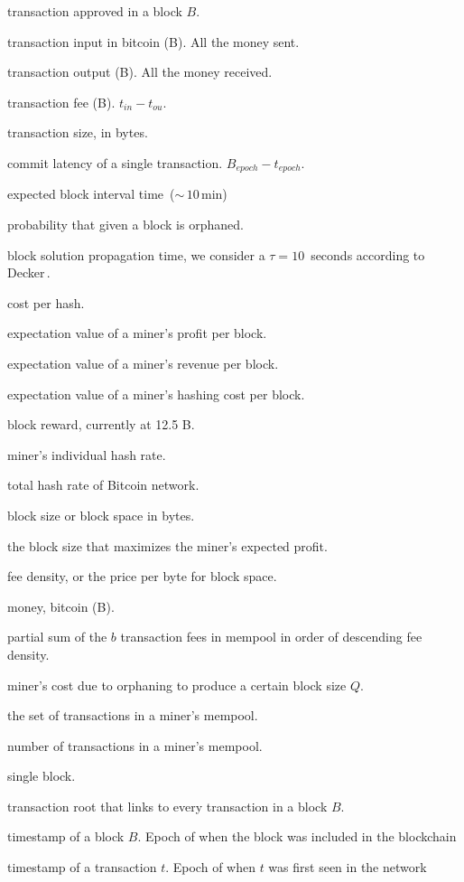 \documentclass[USenglish]{uit-thesis}
\def\bitcoin{\leavevmode\rlap{\hskip.5pt-}B}
\begin{document}
\begin{appendices}
\begin{description}[leftmargin=!, labelwidth=\widthof{\bfseries $M_{demand}(b)$ }]
	\setlength\itemsep{1em}
	\item [$t_B$] transaction approved in a block $B$.
	\item [$t_{in}$] transaction input in bitcoin (\bitcoin). All the money sent.
	\item [$t_{ou}$] transaction output (\bitcoin). All the money received.
	\item [$t_{f}$] transaction fee (\bitcoin). $t_{in} - t_{ou}$.
	\item [$t_q$] transaction size, in bytes.
	\item [$t_l$] commit latency of a single transaction. $B_{epoch} - t_{epoch}$.
	\item [$\mathcal{T}$] expected block interval time~($\sim$\,$10$\,min)
	\item [$\mathbb{P}_{orphan}$] probability that given a block is orphaned.
	\item [$\tau$] block solution propagation time, we consider a $\tau = 10$\,
	seconds according to Decker\,\cite{Decker2013IPBN}.
	\item [$\eta$] cost per hash.
	\item [$\langle \Pi \rangle$] expectation value of a miner’s profit per block.
	\item [$\langle V\rangle$] expectation value of a miner’s revenue per block.
	\item [$\langle C\rangle$] expectation value of a miner's hashing cost per block.
	\item [$R$] block reward, currently at 12.5 \bitcoin.
	\item [$h$] miner's individual hash rate.
	\item [$H$] total hash rate of Bitcoin network.
	\item [$Q$] block size or block space in bytes.
	\item [$Q^*$] the block size that maximizes the miner’s expected profit.
	\item [$\rho$] fee density, or the price per byte for block space.
	\item [$M$] money, bitcoin (\bitcoin).
	\item [$M_{demand}(b)$] partial sum of the $b$ transaction fees
	in mempool in order of descending fee density.
	\item [$M_{supply}(Q)$] miner’s cost due to orphaning to produce a certain block size $Q$.
	\item [$\mathcal{N}$] the set of transactions in a miner’s mempool.
	\item [$n$] number of transactions in a miner’s mempool.
	\item [$B$] single block.
	\item [$B_t$] transaction root that links to every transaction in a block $B$.
	\item [$B_{epoch}$] timestamp of a block $B$.
	Epoch of when the block was included in the blockchain
	\item [$t_{epoch}$] timestamp of a transaction $t$.
	Epoch of when $t$ was first seen in the network
\end{description}


\end{appendices}
\end{document}
